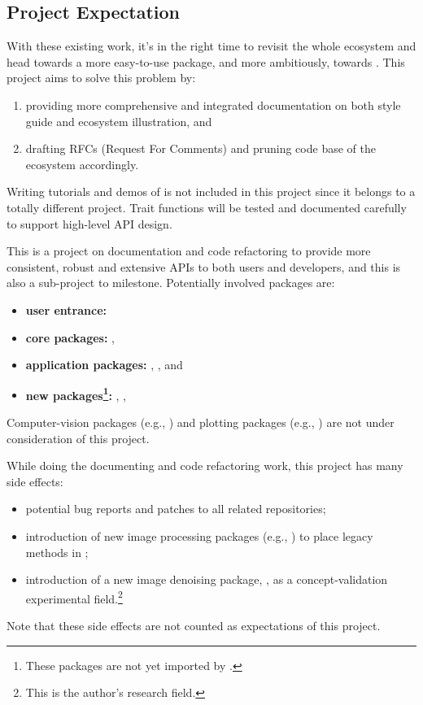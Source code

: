 \newpage
\subsection*{Project Expectation}
With these existing work, it's in the right time to revisit the whole \images{} ecosystem and head towards a more easy-to-use \images{} package, and more ambitiously, towards \images{} . This project aims to solve this problem by:
\begin{enumerate}
    \item providing more comprehensive and integrated documentation on both style guide and ecosystem illustration, and
    \item drafting RFCs (Request For Comments) and pruning code base of the ecosystem accordingly.
\end{enumerate}
Writing tutorials and demos of \images{} is not included in this project since it belongs to a totally different project. Trait functions will be tested and documented carefully to support high-level API design.

{\normalsize
This is a project on documentation and code refactoring to provide more consistent, robust and extensive APIs to both users and developers, and this is also a sub-project to \images{}  milestone. Potentially involved packages are:
\small
\begin{itemize}
    \item \textbf{user entrance:} \repoimages
    \item \textbf{core packages:} \repoimagecore, \repoimageaxes
    \item \textbf{application packages:} \repoimagemorphology, \repoimagetransformations, \repoimagedistance \repoimagemetadata and \repoimagefiltering
    \item \textbf{new packages\footnote{These packages are not yet imported by \images.}:} \repoimagebinarization, \repohistogramthresholding, \repoimageinpainting
\end{itemize}
\normalsize
Computer-vision packages (e.g., \repoimagetracking) and plotting packages (e.g., \repoimageview) are not under consideration of this project.\par}

While doing the documenting and code refactoring work, this project has many side effects:
{\normalsize
\begin{itemize}
    \item potential bug reports and patches to all related \langjulia repositories;
    \item introduction of new image processing packages (e.g., ) to place legacy methods in \images;
    \item introduction of a new image denoising package, \repoimagenoise, as a concept-validation experimental field.\footnote{This is the author's research field.}
\end{itemize}
}
Note that these side effects are not counted as expectations of this project.\par

